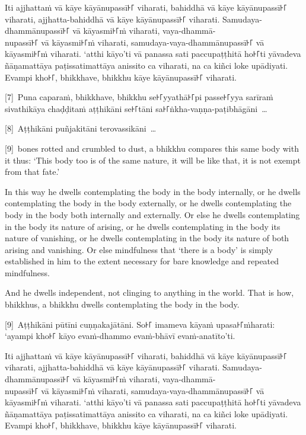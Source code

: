 Iti ajjhattaṁ vā kāye kāyānupassī꜔꜒ viharati, bahiddhā vā kāye kāyānupassī꜔꜒
viharati, ajjhatta-bahiddhā vā kāye kāyānupassī꜔꜒ viharati. Samudaya-dhammānupassī꜔꜒
vā kāyasmi꜔꜒ṁ viharati, vaya-dhammā-\\
nupassī꜔꜒ vā kāyasmi꜔꜒ṁ viharati, samudaya-vaya-dhammānupassī꜔꜒ vā kāyasmi꜔꜒ṁ viharati.
‘atthi kāyo’ti vā panassa sati paccupaṭṭhitā ho꜔꜒ti yāvadeva ñāṇamattāya
paṭissatimattāya anissito ca viharati, na ca kiñci loke upādiyati. Evampi kho꜔꜒,
bhikkhave, bhikkhu kāye kāyānupassī꜔꜒ viharati.

[7]~Puna caparaṁ, bhikkhave, bhikkhu se꜔꜒yyathā꜔꜒pi passe꜔꜒yya sarīraṁ sivathikāya
chaḍḍitaṁ aṭṭhikāni se꜔꜒tāni sa꜔꜒ṅkha-vaṇṇa-paṭibhāgāni~\ldots{}

[8]~Aṭṭhikāni puñjakitāni terovassikāni~\ldots{}

\englishPage

[9]~bones rotted and crumbled to dust, a bhikkhu compares this same
body with it thus: ‘This body too is of the same nature, it will be like that,
it is not exempt from that fate.’

In this way he dwells contemplating the body in the body internally, or he
dwells contemplating the body in the body externally, or he dwells contemplating
the body in the body both internally and externally. Or else he dwells
contemplating in the body its nature of arising, or he dwells contemplating in
the body its nature of vanishing, or he dwells contemplating in the body its
nature of both arising and vanishing. Or else mindfulness that ‘there is a body’
is simply established in him to the extent necessary for bare knowledge and
repeated mindfulness.

And he dwells independent, not clinging to anything in the world. That is how,
bhikkhus, a bhikkhu dwells contemplating the body in the body.



\paliPage

[9]~Aṭṭhikāni pūtīni cuṇṇakajātāni. So꜔꜒ imameva kāyaṁ upasa꜔꜒ṁharati: ‘ayampi kho꜔꜒
kāyo evaṁ-dhammo evaṁ-bhāvī evaṁ-anatīto’ti.

Iti ajjhattaṁ vā kāye kāyānupassī꜔꜒ viharati, bahiddhā vā kāye kāyānupassī꜔꜒
viharati, ajjhatta-bahiddhā vā kāye kāyānupassī꜔꜒ viharati. Samudaya-dhammānupassī꜔꜒
vā kāyasmi꜔꜒ṁ viharati, vaya-dhammā-\\
nupassī꜔꜒ vā kāyasmi꜔꜒ṁ viharati, samudaya-vaya-dhammānupassī꜔꜒ vā kāyasmi꜔꜒ṁ viharati.
‘atthi kāyo’ti vā panassa sati paccupaṭṭhitā ho꜔꜒ti yāvadeva ñāṇamattāya
paṭissatimattāya anissito ca viharati, na ca kiñci loke upādiyati. Evampi kho꜔꜒,
bhikkhave, bhikkhu kāye kāyānupassī꜔꜒ viharati.

